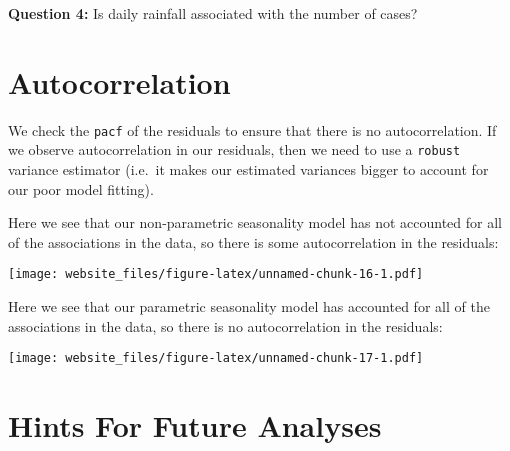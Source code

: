 \documentclass[]{book}
\newenvironment{Shaded}{\begin{snugshade}}{\end{snugshade}}
\newcommand{\KeywordTok}[1]{\textcolor[rgb]{0.13,0.29,0.53}{\textbf{#1}}}
\newcommand{\DataTypeTok}[1]{\textcolor[rgb]{0.13,0.29,0.53}{#1}}
\newcommand{\StringTok}[1]{\textcolor[rgb]{0.31,0.60,0.02}{#1}}
\newcommand{\OperatorTok}[1]{\textcolor[rgb]{0.81,0.36,0.00}{\textbf{#1}}}
\newcommand{\ErrorTok}[1]{\textcolor[rgb]{0.64,0.00,0.00}{\textbf{#1}}}
\newcommand{\NormalTok}[1]{#1}
\begin{document}
\textbf{Question 4:} Is daily rainfall associated with the number of
cases?

\section{Autocorrelation}\label{autocorrelation-1}

We check the \texttt{pacf} of the residuals to ensure that there is no
autocorrelation. If we observe autocorrelation in our residuals, then we
need to use a \texttt{robust} variance estimator (i.e.~it makes our
estimated variances bigger to account for our poor model fitting).

Here we see that our non-parametric seasonality model has not accounted
for all of the associations in the data, so there is some
autocorrelation in the residuals:

\begin{Shaded}
\end{Shaded}

\texttt{[image: website\_files/figure-latex/unnamed-chunk-16-1.pdf]}

Here we see that our parametric seasonality model has accounted for all
of the associations in the data, so there is no autocorrelation in the
residuals:

\begin{Shaded}
\end{Shaded}

\texttt{[image: website\_files/figure-latex/unnamed-chunk-17-1.pdf]}

\section{Hints For Future Analyses}\label{hints-for-future-analyses}
\end{document}
